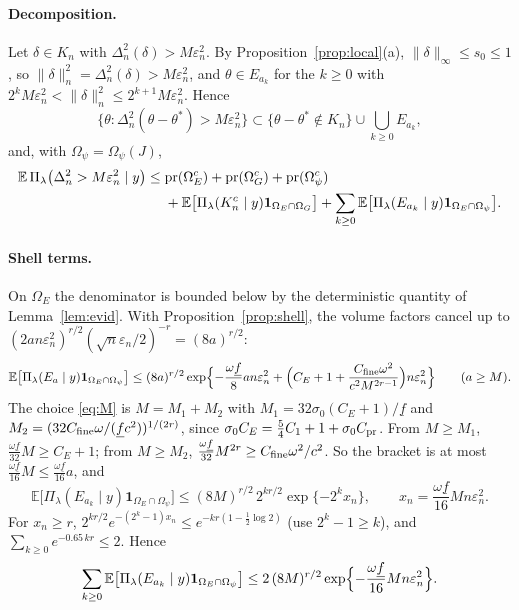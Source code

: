 \documentclass[11pt]{article}
\theoremstyle{definition}
\theoremstyle{remark}
\newcommand{\E}{\mathbb{E}}
\newcommand{\pr}{\mathrm{pr}}
\newcommand{\thetas}{\theta^{*}}
\newcommand{\om}{\omega}
\newcommand{\en}{\varepsilon_n}
\newcommand{\fl}{\underline f}
\newcommand{\nn}[1]{\|#1\|_n}
\newcommand{\ind}{\mathbf 1}
\begin{document}
\paragraph{Decomposition.} Let $\delta\in K_n$ with $\Delta_n^2(\delta)>M\en^2$. By Proposition~\ref{prop:local}(a), $\|\delta\|_\infty\le s_0\le1$, so $\nn{\delta}^2=\Delta_n^2(\delta)>M\en^2$, and $\theta\in E_{a_k}$ for the $k\ge0$ with $2^kM\en^2<\nn{\delta}^2\le2^{k+1}M\en^2$. Hence
\[
\bigl\{\theta:\Delta_n^2(\theta-\thetas)>M\en^2\bigr\}\subset\{\theta-\thetas\notin K_n\}\cup\bigcup_{k\ge0}E_{a_k},
\]
and, with $\Omega_\psi=\Omega_\psi(J)$,
\begin{align}
\E\,\Pi_\lambda\bigl(\Delta_n^2>M\en^2\mid y\bigr)\le{}&\pr(\Omega_E^c)+\pr(\Omega_G^c)+\pr(\Omega_\psi^c)\notag\\
&+\E\bigl[\Pi_\lambda(K_n^c\mid y)\ind_{\Omega_E\cap\Omega_G}\bigr]+\sum_{k\ge0}\E\bigl[\Pi_\lambda(E_{a_k}\mid y)\ind_{\Omega_E\cap\Omega_\psi}\bigr].\label{eq:decomp}
\end{align}

\paragraph{Shell terms.} On $\Omega_E$ the denominator is bounded below by the deterministic quantity of Lemma~\ref{lem:evid}. With Proposition~\ref{prop:shell}, the volume factors cancel up to $(2an\en^2)^{r/2}(\sqrt n\en/2)^{-r}=(8a)^{r/2}$:
\[
\E\bigl[\Pi_\lambda(E_a\mid y)\ind_{\Omega_E\cap\Omega_\psi}\bigr]\le(8a)^{r/2}\exp\Bigl\{-\frac{\om\fl}{8}an\en^2+\Bigl(C_E+1+\frac{C_{\rm fine}\om^2}{c^2M^{2r-1}}\Bigr)n\en^2\Bigr\}\qquad(a\ge M).
\]
The choice \eqref{eq:M} is $M=M_1+M_2$ with $M_1=32\sigma_0(C_E+1)/\fl$ and $M_2=(32C_{\rm fine}\om/(\fl c^2))^{1/(2r)}$, since $\sigma_0C_E=\tfrac54C_1+1+\sigma_0C_{\rm pr}$. From $M\ge M_1$, $\tfrac{\om\fl}{32}M\ge C_E+1$; from $M\ge M_2$, $\tfrac{\om\fl}{32}M^{2r}\ge C_{\rm fine}\om^2/c^2$. So the bracket is at most $\tfrac{\om\fl}{16}M\le\tfrac{\om\fl}{16}a$, and
\[
\E\bigl[\Pi_\lambda(E_{a_k}\mid y)\ind_{\Omega_E\cap\Omega_\psi}\bigr]\le(8M)^{r/2}\,2^{kr/2}\exp\{-2^kx_n\},\qquad x_n=\frac{\om\fl}{16}Mn\en^2 .
\]
For $x_n\ge r$, $2^{kr/2}e^{-(2^k-1)x_n}\le e^{-kr(1-\frac12\log2)}$ (use $2^k-1\ge k$), and $\sum_{k\ge0}e^{-0.65\,kr}\le2$. Hence
\begin{equation}\label{eq:shellsum}
\sum_{k\ge0}\E\bigl[\Pi_\lambda(E_{a_k}\mid y)\ind_{\Omega_E\cap\Omega_\psi}\bigr]\le2\,(8M)^{r/2}\exp\Bigl\{-\frac{\om\fl}{16}Mn\en^2\Bigr\}.
\end{equation}
\end{document}
